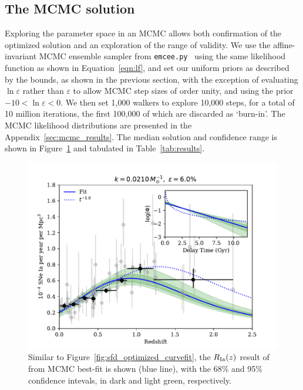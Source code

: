 \documentclass[apj]{aastex62}
\begin{document}
\subsection{The MCMC solution\label{sec:mcmc_sfd}}
Exploring the parameter space in an MCMC allows both confirmation of the optimized solution and an exploration of the range of validity. We use the affine-invariant MCMC ensemble sampler from {\tt emcee.py}~\citep{Foreman-Mackey:2013pd} using the same likelihood function as shown in Equation~\ref{eqn:lf}, and set our uniform priors as described by the bounds, as shown in the previous section, with the exception of evaluating $\ln \varepsilon$ rather than $\varepsilon$ to allow MCMC step sizes of order unity, and using the prior $ -10 < \ln \varepsilon < 0$. We then set 1,000 walkers to explore 10,000 steps, for a total of 10 million iterations, the first 100,000 of which are discarded as `burn-in'. The MCMC likelihood distributions are presented in the Appendix~\ref{sec:mcmc_results}. The median solution and confidence range is shown in Figure~\ref{fig:figure_fit_demo_werr} and tabulated in Table~\ref{tab:results}.
\begin{figure}[t]
   \centering
   \includegraphics[width=6.1in]{figure_fit_demo_werr.pdf} 
   \caption{\footnotesize Similar to Figure~\ref{fig:sfd_optimized_curvefit}, the $R_{\rm Ia}(z)$ result of from MCMC best-fit is shown (blue line), with the 68\% and 95\% confidence intevals, in dark and light green, respectively. }
   \label{fig:figure_fit_demo_werr}
\end{figure}
\end{document}
